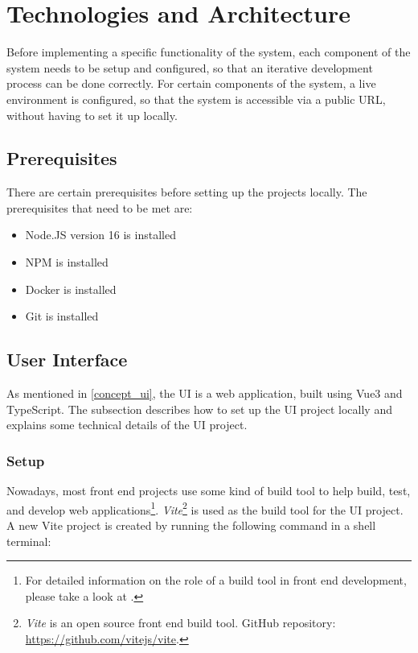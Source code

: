 \section{Technologies and Architecture}

Before implementing a specific functionality of the system, each component of the system needs to be setup and configured, so that an iterative development process can be done correctly. For certain components of the system, a live environment is configured, so that the system is accessible via a public URL, without having to set it up locally. 

\subsection{Prerequisites}

  There are certain prerequisites before setting up the projects locally. The prerequisites that need to be met are: 

  \begin{itemize}
  \item Node.JS version 16 is installed
  \item NPM is installed
  \item Docker is installed
  \item Git is installed
  \end{itemize}

 \subsection{User Interface}

    As mentioned in \autoref{concept_ui}, the UI is a web application, built using Vue3 and TypeScript. The subsection describes how to set up the UI project locally and explains some technical details of the UI project. 

  \subsubsection{Setup}
   Nowadays, most front end projects use some kind of build tool to help build, test, and develop web applications\footnote{For detailed information on the role of a build tool in front end development, please take a look at \autocite{Odell2014}.}. \emph{Vite}\footnote{\emph{Vite} is an open source front end build tool. GitHub repository: \url{https://github.com/vitejs/vite}.} is used as the build tool for the UI project. A new Vite project is created by running the following command in a shell terminal:
  
